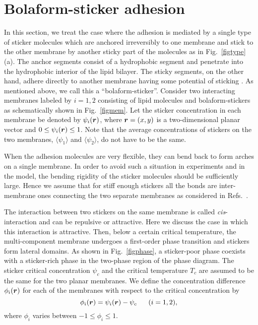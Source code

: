 \section{Bolaform-sticker adhesion}
\label{sec:single}


In this section, we treat the case where the adhesion is mediated
by a single type of sticker molecules which are anchored irreversibly
to one membrane and stick to the other membrane by another sticky 
part of the molecules as in Fig.\ \ref{figtype}(a).
The anchor segments consist of a hydrophobic segment and 
penetrate into the hydrophobic interior of the lipid bilayer.
The sticky segments, on the other hand, adhere directly to another 
membrane having some potential of sticking \cite{Lipowsky97}.  
As mentioned above, we call this a ``bolaform-sticker''. Consider
two interacting membranes labeled by $i=1,2$ consisting of lipid
molecules and bolaform-stickers as schematically shown in Fig.\
\ref{figmem}. Let the sticker concentration in each membrane be
denoted by $\psi_i(\mbox{\boldmath $r$})$, where
$\mbox{\boldmath $r$}=(x,y)$ is a two-dimensional planar vector
and $0 \le \psi_i(\mbox{\boldmath $r$}) \le 1$. Note that the
average concentrations of stickers on the two membranes, $\langle
\psi_1\rangle$ and $\langle \psi_2\rangle$, do not have to be the
same.


When the adhesion molecules are very flexible, they can bend
back to form arches on a single membrane.
In order to avoid such a situation in experiments and in the model, the
bending rigidity of the sticker molecules should be sufficiently large.
Hence we assume that for stiff enough stickers all the bonds are
inter-membrane ones connecting the two separate membranes
as considered in Refs.\ \cite{Lipowsky96,Lipowsky97}.


The interaction  between two stickers on the same membrane is
called {\it cis}-interaction and can be repulsive or attractive.
Here we discuss the case in which this interaction is attractive.
Then, below a certain critical temperature, the multi-component
membrane undergoes a first-order phase transition and stickers
form lateral domains. As shown in Fig.\ \ref{figphase}, a
sticker-poor phase coexists with a sticker-rich phase in the
two-phase region of the phase diagram. The sticker critical
concentration $\psi_c$ and the critical temperature $T_c$ are
assumed to be the same for the two planar membranes. We define the
concentration difference $\phi_i(\mbox{\boldmath $r$})$ for each
of the membranes with respect to the critical concentration by
\begin{equation}
\phi_i(\mbox{\boldmath $r$}) = \psi_i(\mbox{\boldmath $r$}) -
\psi_c~~~~~(i=1,2), \label{difference}
\end{equation}
where $\phi_i$  varies between $-1 \le \phi_i \le 1$.


